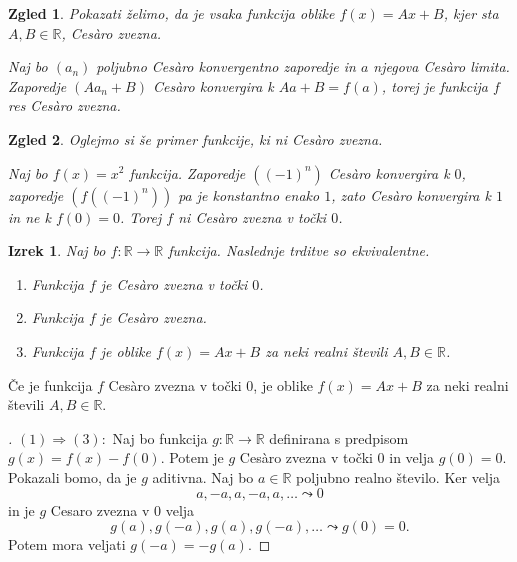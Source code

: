 \documentclass{beamer}
\newtheorem{izrek}{Izrek}
\newtheorem{zgled}{Zgled}
\newenvironment{dokaz}{\begin{proof}[\bfseries\upshape\proofname]}{\end{proof}}
\begin{document}
\begin{frame}
    \begin{zgled}
        Pokazati želimo, da je vsaka funkcija oblike $f(x) = Ax + B$, kjer sta $A, B \in \mathbb{R}$, Ces\`{a}ro zvezna. 
        \pause

        Naj bo $(a_n)$ poljubno Ces\`{a}ro konvergentno zaporedje in $a$ njegova Ces\`{a}ro limita. Zaporedje $(A a_n + B)$ Ces\`{a}ro konvergira k $A a + B = f(a)$, torej je funkcija $f$ res Ces\`{a}ro zvezna.
    \end{zgled}
    \pause
    \begin{zgled}
        Oglejmo si še primer funkcije, ki ni Ces\`{a}ro zvezna. 
        \pause

        Naj bo $f(x) = x^2$ funkcija. Zaporedje $((-1)^n)$ Ces\`{a}ro konvergira k $0$, zaporedje $(f((-1)^n))$ pa je konstantno enako $1$, zato Ces\`{a}ro konvergira k $1$ in ne k $f(0) = 0$. Torej $f$ ni Ces\`{a}ro zvezna v točki $0$.
    \end{zgled}
\end{frame}

\begin{frame}
    \begin{izrek}
        \label{klaszvez}
        Naj bo $f: \mathbb{R} \rightarrow \mathbb{R}$ funkcija. Naslednje trditve so ekvivalentne.
        \begin{enumerate}
            \item Funkcija $f$ je Ces\`{a}ro zvezna v točki $0$.
            \item Funkcija $f$ je Ces\`{a}ro zvezna.
            \item Funkcija $f$ je oblike $f(x) = Ax + B$ za neki realni števili $A, B \in \mathbb{R}$.
        \end{enumerate}
    \end{izrek}
\end{frame}

\begin{frame}
    \begin{block}{}
        Če je funkcija $f$ Ces\`{a}ro zvezna v točki $0$, je oblike $f(x) = Ax + B$ za neki realni števili $A, B \in \mathbb{R}$.
    \end{block}
    \begin{dokaz}\renewcommand{\qedsymbol}{}
        $(1) \Rightarrow (3): $ Naj bo funkcija $g: \mathbb{R} \rightarrow \mathbb{R}$ definirana s predpisom $g(x) = f(x) - f(0)$. Potem je $g$ Ces\`{a}ro zvezna v točki $0$ in velja $g(0) = 0$. Pokazali bomo, da je $g$ aditivna.
        \pause
        Naj bo $a \in \mathbb{R}$ poljubno realno število. Ker velja $$a, -a, a, -a, a, \ldots \leadsto 0$$ in je $g$ Cesaro zvezna v $0$ velja $$g(a), g(-a), g(a), g(-a), \ldots \leadsto g(0) = 0.$$ 
        \pause 
        Potem mora veljati $g(-a) = -g(a)$. 
    \end{dokaz}
\end{frame}
\end{document}
